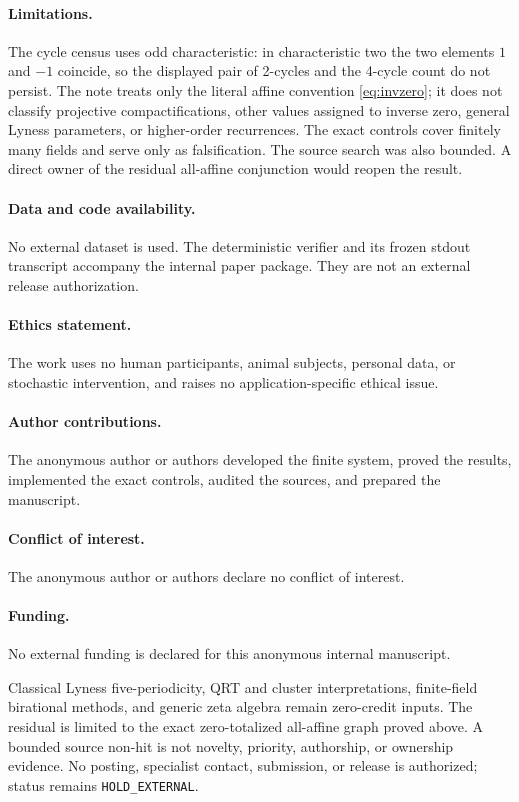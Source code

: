 \documentclass[10pt,a4paper]{amsart}
\theoremstyle{definition}
\theoremstyle{remark}
\begin{document}
\paragraph{Limitations.}
The cycle census uses odd characteristic: in characteristic two the two
elements $1$ and $-1$ coincide, so the displayed pair of 2-cycles and the
4-cycle count do not persist.  The note treats only the literal affine
convention \eqref{eq:invzero}; it does not classify projective
compactifications, other values assigned to inverse zero, general Lyness
parameters, or higher-order recurrences.  The exact controls cover finitely
many fields and serve only as falsification.  The source search was also
bounded.  A direct owner of the residual all-affine conjunction would reopen
the result.

\paragraph{Data and code availability.}
No external dataset is used.  The deterministic verifier and its frozen
stdout transcript accompany the internal paper package.  They are not an
external release authorization.

\paragraph{Ethics statement.}
The work uses no human participants, animal subjects, personal data, or
stochastic intervention, and raises no application-specific ethical issue.

\paragraph{Author contributions.}
The anonymous author or authors developed the finite system, proved the
results, implemented the exact controls, audited the sources, and prepared
the manuscript.

\paragraph{Conflict of interest.}
The anonymous author or authors declare no conflict of interest.

\paragraph{Funding.}
No external funding is declared for this anonymous internal manuscript.

Classical Lyness five-periodicity, QRT and cluster interpretations,
finite-field birational methods, and generic zeta algebra remain zero-credit
inputs.  The residual is limited to the exact zero-totalized all-affine graph
proved above.  A bounded source non-hit is not novelty, priority, authorship,
or ownership evidence.  No posting, specialist contact, submission, or
release is authorized; status remains \texttt{HOLD\_EXTERNAL}.



\end{document}
